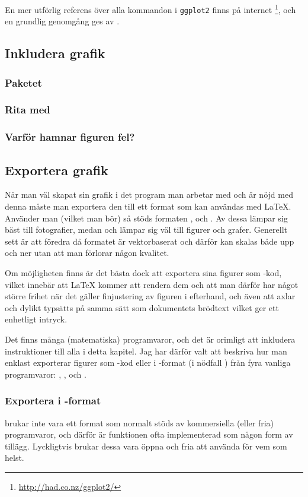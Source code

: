 \documentclass[lang=sv,ptsize=10pt,font=none,nomath,titles=bf,../../a4.tex]{subfiles}
\begin{document}
En mer utförlig referens över alla kommandon i \texttt{ggplot2} finns på internet%
\footnote{\url{http://had.co.nz/ggplot2/}}, och en grundlig genomgång ges av
\textcite{Hadley09}.

\subsection{Inkludera grafik}
\subsubsection{Paketet }
\subsubsection{Rita med \PGFTikZ}
\subsubsection{Varför hamnar figuren fel?}

\subsection{Exportera grafik}
När man väl skapat sin grafik i det program man arbetar med och är nöjd
med denna måste man exportera den till ett format som kan användas med
\LaTeX. Använder man \pdfLaTeX (vilket man bör) så stöds formaten \JPEG,
\PNG och \PDF. Av dessa lämpar sig \JPEG bäst till fotografier, medan
\PNG och \PDF lämpar sig väl till figurer och grafer.
Generellt sett är \PDF att föredra då formatet är vektorbaserat och
därför kan skalas både upp och ner utan att man förlorar någon kvalitet.

Om möjligheten finns är det bästa dock att exportera sina figurer som
\PGFTikZ-kod, vilket innebär att \LaTeX{} kommer att rendera dem och att
man därför har något större frihet när det gäller finjustering av figuren
i efterhand, och även att axlar och dylikt typsätts på samma sätt som
dokumentets brödtext vilket ger ett enhetligt intryck.

Det finns många (matematiska) programvaror, och det är orimligt att
inkludera instruktioner till alla i detta kapitel. Jag har därför valt
att beskriva hur man enklast exporterar figurer som \PGFTikZ-kod eller
i \PDF-format (i nödfall \PNG) från fyra vanliga programvaror:
\Rlogo, \MATLAB, \Mathematica och \gnuplot.

\subsubsection{Exportera i \PGFTikZ-format}
\PGFTikZ brukar inte vara ett format som normalt stöds av kommersiella
(eller fria) programvaror, och därför är funktionen ofta implementerad
som någon form av tillägg. Lyckligtvis brukar dessa vara öppna och fria
att använda för vem som helst.
\end{document}
